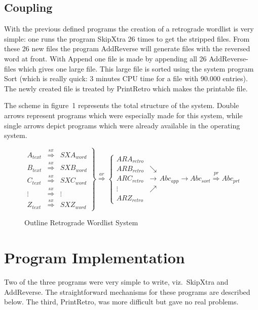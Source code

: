\subsection{Coupling}
With the previous defined programs the creation of a retrograde wordlist is 
very simple: one runs the program SkipXtra 26 times to get the stripped files. 
From these 26 new files the program AddReverse will generate files with the 
reversed word at front. With Append one file is made by appending all 26 
AddReverse-files which gives one large file. This large file is sorted using the
system program Sort (which is really quick: 3 minutes CPU time for a file with 
90.000 entries). The newly created file is treated by PrintRetro which makes 
the printable file.

The scheme in figure~1 represents the total structure of the system. Double 
arrows represent programs which were especially made for this system, while 
single arrows depict programs which were already available in the operating 
system.
\begin{figure}
 \[ \left.
     \begin{array}{ccc} 
        A_{text} & \stackrel{sx}{\Longrightarrow} & SXA_{word}\\ 
        B_{text} & \stackrel{sx}{\Longrightarrow} & SXB_{word}\\ 
        C_{text} & \stackrel{sx}{\Longrightarrow} & SXC_{word}\\ 
        \vdots   & \stackrel{sx}{\Longrightarrow} & \vdots  \\ 
        Z_{text} & \stackrel{sx}{\Longrightarrow} & SXZ_{word}
     \end{array}
    \right\}
     \stackrel{ar}{\Longrightarrow}
    \left\{
     \begin{array}{cc} 
        ARA_{retro} &             \\
        ARB_{retro} & \searrow    \\
        ARC_{retro} & \rightarrow \\
        \vdots    & \nearrow    \\
        ARZ_{retro}
    \end{array}
   \right.
   Abc_{app} \rightarrow Abc_{sort} \stackrel{pr}{\Longrightarrow} Abc_{prt}
 \]
 \caption{Outline Retrograde Wordlist System}
\end{figure}
\section{Program Implementation}
 Two of the three programs were very simple to write, viz.\ SkipXtra and 
 AddReverse. The straightforward mechanisms for these programs are described 
 below. The third, PrintRetro, was more difficult but gave no real problems.
